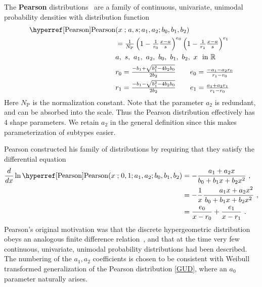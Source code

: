 

\label{sec:Pearson}
{} 
The {\bf Pearson} distributions~\cite{Pearson1895, Pearson1901, Pearson1916, Ord1972, Johnson1994} are a family of continuous, univariate, unimodal probability densities with distribution function
\begin{align}
\label{Pearson}
 \opr{Pearson}&(x\given a, s; a_1, a_2;  b_0, b_1, b_2) 
 \\ \notag
 &=  \tfrac{1}{N_{\text{P}}} \left(1- \tfrac{1}{r_0}\tfrac{x-a}{s} \right)^{e_0} \left(1- \tfrac{1}{r_1}\tfrac{x-a}{s} \right)^{e_1}
\\ \notag
&  a,\ s,\  a_1,\ a_2,\ b_0,\ b_1,\ b_2,\ x\  \text{ in } \mathbb{R}
\\ \notag
& r_0 = \tfrac{-b_1+\sqrt{b_1^2 - 4b_2b_0} }{2b_2} \checked  \qquad e_0 = \tfrac{-a_1-a_2 r_0}{r_1-r_0} \\
\notag
& r_1 = \tfrac{-b_1-\sqrt{b_1^2 - 4b_2b_0} }{2b_2} \checked \qquad e_1 = \tfrac{a_1+a_2 r_1}{r_1-r_0} 
\end{align}
Here $N_{\text{P}}$ is the normalization constant. Note that the parameter $a_2$  is redundant, and can be absorbed into the scale. Thus the Pearson distribution effectively has 4 shape parameters. We retain $a_2$ in the general definition since this makes parameterization of subtypes easier. 


Pearson constructed his family of distributions by requiring that they satisfy the differential equation
\begin{align*}
\frac{d}{dx} \ln  \opr{Pearson}(x\given 0, 1; a_1, a_2; b_0, b_1, b_2) 
&= - \frac{a_1 + a_2 x  }{b_0+ b_1 x+ b_2 x^2  } \ ,  \checked \\
&= - \frac{1}{x} \frac{\phantom{a_0 + {} } a_1 x + a_2 x^2  }{b_0+ b_1 x+ b_2 x^2  } \ ,  \checked \\
&= \frac{e_0}{x-r_0} + \frac{e_1}{x-r_1} \ . \checked
\end{align*}
Pearson's original motivation was that the discrete hypergeometric distribution obeys an analogous finite difference relation~\cite{Ord1972}, and that at the time very few continuous, univariate, unimodal probability distributions had been described. The numbering of the $a_1, a_2$ coefficients is chosen to be consistent with Weibull transformed generalization of the Pearson distribution \eqref{GUD}, where an $a_0$ parameter naturally arises. 


